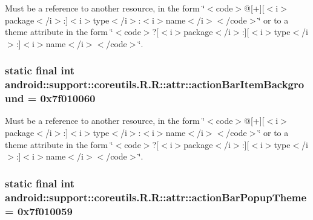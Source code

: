 Must be a reference to another resource, in the form \char`\"{}$<$code$>$@\mbox{[}+\mbox{]}\mbox{[}$<$i$>$package$<$/i$>$:\mbox{]}$<$i$>$type$<$/i$>$:$<$i$>$name$<$/i$>$$<$/code$>$\char`\"{} or to a theme attribute in the form \char`\"{}$<$code$>$?\mbox{[}$<$i$>$package$<$/i$>$:\mbox{]}\mbox{[}$<$i$>$type$<$/i$>$:\mbox{]}$<$i$>$name$<$/i$>$$<$/code$>$\char`\"{}. \hypertarget{classandroid_1_1support_1_1coreutils_1_1_r_1_1attr_e9117464811933168868b1719e976cdb}{
\subsubsection[{actionBarItemBackground}]{\setlength{\rightskip}{0pt plus 5cm}static final int android::support::coreutils.R.R::attr::actionBarItemBackground = 0x7f010060}}
\label{classandroid_1_1support_1_1coreutils_1_1_r_1_1attr_e9117464811933168868b1719e976cdb}


Must be a reference to another resource, in the form \char`\"{}$<$code$>$@\mbox{[}+\mbox{]}\mbox{[}$<$i$>$package$<$/i$>$:\mbox{]}$<$i$>$type$<$/i$>$:$<$i$>$name$<$/i$>$$<$/code$>$\char`\"{} or to a theme attribute in the form \char`\"{}$<$code$>$?\mbox{[}$<$i$>$package$<$/i$>$:\mbox{]}\mbox{[}$<$i$>$type$<$/i$>$:\mbox{]}$<$i$>$name$<$/i$>$$<$/code$>$\char`\"{}. \hypertarget{classandroid_1_1support_1_1coreutils_1_1_r_1_1attr_41e5cf1ffec6cfbe3c124bc3d33ead92}{
\subsubsection[{actionBarPopupTheme}]{\setlength{\rightskip}{0pt plus 5cm}static final int android::support::coreutils.R.R::attr::actionBarPopupTheme = 0x7f010059}}
\label{classandroid_1_1support_1_1coreutils_1_1_r_1_1attr_41e5cf1ffec6cfbe3c124bc3d33ead92}


